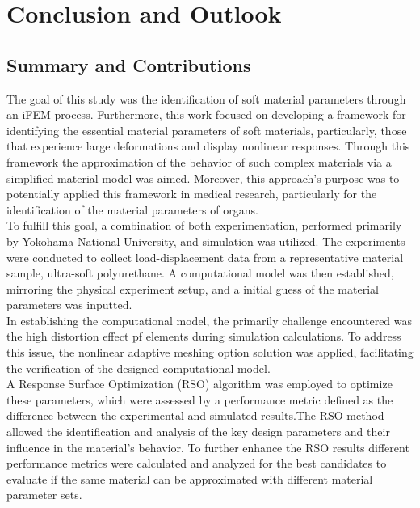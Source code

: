 
\chapter{Conclusion and Outlook} %

\label{Chapter7} %

\section{Summary and Contributions}
The goal of this study was the identification of soft material parameters through 
an iFEM process. Furthermore, this work focused on developing a framework for identifying the 
essential material parameters of soft materials, particularly, those that experience 
large deformations and display nonlinear responses. Through this framework the 
approximation of the behavior of such complex materials via a simplified material model
was aimed. Moreover, this approach's purpose was to potentially applied this framework in medical research,
particularly for the identification of the material parameters of organs.\\

To fulfill this goal, a combination of both experimentation, performed primarily by Yokohama National University, 
and simulation was utilized. The experiments were conducted to collect load-displacement data from
a representative material sample, ultra-soft polyurethane. A computational model was then 
established, mirroring the physical experiment setup, and a initial guess of the material 
parameters was inputted.\\

In establishing the computational model, the primarily challenge encountered was the 
high distortion effect pf elements during simulation calculations. To address this issue, the nonlinear adaptive 
meshing option solution was applied, facilitating the verification of the designed 
computational model.\\

A Response Surface Optimization (RSO) algorithm was employed to optimize these 
parameters, which were assessed by a performance metric defined as the difference between the 
experimental and simulated results.The RSO method allowed the identification and analysis of the 
key design parameters and their influence in the material's behavior. 
To further enhance the RSO results different performance metrics were calculated and analyzed for 
the best candidates to evaluate if the same material can be approximated with different material 
parameter sets.\\



